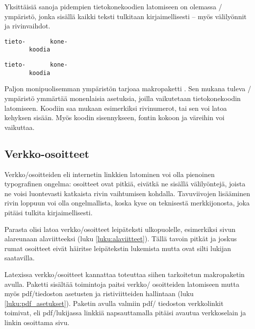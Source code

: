 Yksittäisiä sanoja pidempien tietokonekoodien latomiseen on olemassa
\-/ ympäristö, jonka sisällä kaikki teksti
tulkitaan kirjaimellisesti -- myös välilyönnit ja rivinvaihdot.

\begin{koodilohkosis}
\begin{verbatim}
tieto-       kone-
       koodia
\end{verbatim}
\end{koodilohkosis}

\begin{tulossis}
\begin{verbatim}
tieto-       kone-
       koodia
\end{verbatim}
\end{tulossis}

Paljon monipuolisemman ympäristön tarjoaa makropaketti
. Sen mukana tuleva
\-/ ympäristö ymmärtää monenlaisia asetuksia,
joilla vaikutetaan tietokonekoodin latomiseen. Koodiin saa mukaan
esimerkiksi rivinumerot, tai sen voi latoa kehyksen sisään. Myös koodin
sisennykseen, fontin kokoon ja väreihin voi vaikuttaa.

\subsection{Verkko-osoitteet}

Verkko\-/osoitteiden eli internetin linkkien latominen voi olla
pienoinen typografinen ongelma: osoitteet ovat pitkiä, eivätkä ne
sisällä välilyöntejä, joista ne voisi luontevasti katkaista rivin
vaihtumisen kohdalla. Tavuviivojen lisääminen rivin loppuun voi olla
ongelmallista, koska kyse on teknisestä merkkijonosta, joka pitäisi
tulkita kirjaimellisesti.

Parasta olisi latoa verkko\-/osoitteet leipäteksti ulkopuolelle,
esimerkiksi sivun alareunaan alaviitteeksi (luku
\ref{luku:alaviitteet}). Tällä tavoin pitkät ja joskus rumat osoitteet
eivät häiritse leipätekstin lukemista mutta ovat silti lukijan
saatavilla.

Latexissa verkko\-/osoitteet kannattaa toteuttaa siihen tarkoitetun
makropaketin avulla. Paketti 
sisältää toimintoja paitsi verkko\-/ osoitteiden latomiseen mutta myös
pdf\-/tiedoston asetusten ja ristiviitteiden hallintaan (luku
\ref{luku:pdf_asetukset}). Paketin avulla valmiin pdf\-/ tiedoston
verkkolinkit toimivat, eli pdf\-/lukijassa linkkiä napsauttamalla
pitäisi avautua verkkoselain ja linkin osoittama sivu.

